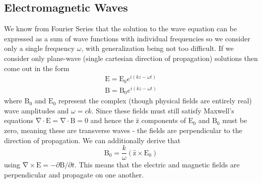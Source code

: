 \documentclass[10pt, twocolumn]{article}
\theoremstyle{definition}
\newcommand{\bv}[1]{\bm{\mathrm{#1}}}
\newcommand{\uz}{\bv{\hat{z}}}
\begin{document}
\subsection{Electromagnetic Waves}
We know from Fourier Series that the solution to the wave equation can be expressed as a sum of wave functions with individual frequencies so we consider
only a single frequency $\omega$, with generalization being not too difficult. If we consider only plane-wave (single cartesian direction of propagation) solutions then come out in the form
\begin{align*}
  \bv{E}=\bv{E}_0e^{i(kz-\omega t)} \\
  \bv{B}=\bv{B}_0e^{i(kz-\omega t)}
\end{align*}
where $\bv{B}_0$ and $\bv{E}_0$ represent the complex (though physical fields are entirely real) wave amplitudes and $\omega=ck$. Since these fields must still
satisfy Maxwell's equations $\bv{\nabla}\cdot\bv{E}=\bv{\nabla}\cdot \bv{B}=0$ and hence the $\uz$ components of $\bv{E}_0$ and $\bv{B}_0$ must be zero, meaning
these are transverse waves - the fields are perpendicular to the direction of propagation. We can additionally derive that
$$\bv{B}_0=\frac{k}{\omega}(\uz\times \bv{E}_0)$$
using $\bv{\nabla}\times\bv{E}=-\partial \bv{B}/\partial t$. This means that the electric and magnetic fields are perpendicular and propagate on one another.
\end{document}
